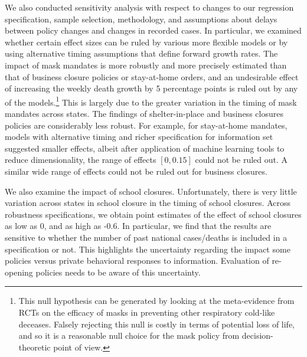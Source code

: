 \documentclass[11pt,reqno,letter]{amsart}
\theoremstyle{definition}
\begin{document}
We also conducted sensitivity analysis with respect to changes to our regression specification, sample selection, methodology, and assumptions about delays between policy changes and changes in recorded cases. In particular, we examined whether certain effect
sizes can be ruled by various more flexible models or by using alternative timing assumptions
that define forward growth rates. The impact of mask mandates is more robustly and more precisely estimated than that of business closure policies or stay-at-home orders, and an undesirable effect of increasing the weekly death growth by 5 percentage points is ruled out by any of the  models.\footnote{This null
hypothesis can be generated by looking at the meta-evidence from RCTs on the efficacy of masks in preventing other respiratory
cold-like deceases. Falsely rejecting this null is   costly in terms of potential loss of life, and so it is a reasonable null choice 
for the mask policy from decision-theoretic point of view.} This is largely due to the greater variation in the timing of mask mandates across states. The findings of shelter-in-place and business closures policies are considerably less robust. For example, for stay-at-home mandates, models with alternative timing and richer specification for information set suggested smaller effects, albeit
after application of machine learning tools to reduce dimensionality, the range of effects $[0,0.15]$ could not be ruled out.  A similar
wide range of effects could  not be ruled out for business closures.



We also examine the impact of school closures. Unfortunately, there is
very little variation across states in school closure in the timing of
school closures.  Across robustness specifications, we obtain point
estimates of the effect of school closures as low as 0, and as high as
-0.6. In particular, we find that the results are sensitive to whether
the number of past national cases/deaths is included in a
specification or not. This highlights the uncertainty regarding the
impact some policies versus private behavioral responses to
information. Evaluation of re-opening policies needs to be aware of
this uncertainty.
\end{document}
